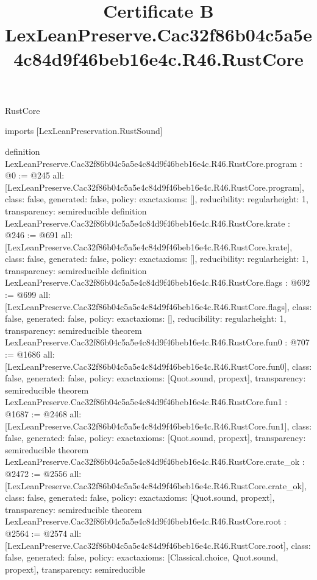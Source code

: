 \begin{lexlean}{RustCore}
\title{Certificate B LexLeanPreserve.Cac32f86b04c5a5e4c84d9f46beb16e4c.R46.RustCore}
\begin{coremodule}
imports [LexLeanPreservation.RustSound]

definition LexLeanPreserve.Cac32f86b04c5a5e4c84d9f46beb16e4c.R46.RustCore.program : @0 := @245 {
  all: [LexLeanPreserve.Cac32f86b04c5a5e4c84d9f46beb16e4c.R46.RustCore.program],
  class: false,
  generated: false,
  policy: exact{axioms: []},
  reducibility: regular{height: 1},
  transparency: semireducible
}
definition LexLeanPreserve.Cac32f86b04c5a5e4c84d9f46beb16e4c.R46.RustCore.krate : @246 := @691 {
  all: [LexLeanPreserve.Cac32f86b04c5a5e4c84d9f46beb16e4c.R46.RustCore.krate],
  class: false,
  generated: false,
  policy: exact{axioms: []},
  reducibility: regular{height: 1},
  transparency: semireducible
}
definition LexLeanPreserve.Cac32f86b04c5a5e4c84d9f46beb16e4c.R46.RustCore.flags : @692 := @699 {
  all: [LexLeanPreserve.Cac32f86b04c5a5e4c84d9f46beb16e4c.R46.RustCore.flags],
  class: false,
  generated: false,
  policy: exact{axioms: []},
  reducibility: regular{height: 1},
  transparency: semireducible
}
theorem LexLeanPreserve.Cac32f86b04c5a5e4c84d9f46beb16e4c.R46.RustCore.fun0 : @707 := @1686 {
  all: [LexLeanPreserve.Cac32f86b04c5a5e4c84d9f46beb16e4c.R46.RustCore.fun0],
  class: false,
  generated: false,
  policy: exact{axioms: [Quot.sound, propext]},
  transparency: semireducible
}
theorem LexLeanPreserve.Cac32f86b04c5a5e4c84d9f46beb16e4c.R46.RustCore.fun1 : @1687 := @2468 {
  all: [LexLeanPreserve.Cac32f86b04c5a5e4c84d9f46beb16e4c.R46.RustCore.fun1],
  class: false,
  generated: false,
  policy: exact{axioms: [Quot.sound, propext]},
  transparency: semireducible
}
theorem LexLeanPreserve.Cac32f86b04c5a5e4c84d9f46beb16e4c.R46.RustCore.crate_ok : @2472 := @2556 {
  all: [LexLeanPreserve.Cac32f86b04c5a5e4c84d9f46beb16e4c.R46.RustCore.crate_ok],
  class: false,
  generated: false,
  policy: exact{axioms: [Quot.sound, propext]},
  transparency: semireducible
}
theorem LexLeanPreserve.Cac32f86b04c5a5e4c84d9f46beb16e4c.R46.RustCore.root : @2564 := @2574 {
  all: [LexLeanPreserve.Cac32f86b04c5a5e4c84d9f46beb16e4c.R46.RustCore.root],
  class: false,
  generated: false,
  policy: exact{axioms: [Classical.choice, Quot.sound, propext]},
  transparency: semireducible
}


\end{coremodule}
\end{lexlean}
